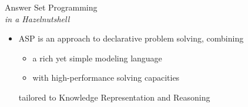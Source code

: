\begin{frame}{Answer Set Programming\\[-2pt]\small\emph{in a Hazelnutshell}}
  \bigskip
  \bigskip
  \begin{itemize}
  \item <1->
    ASP is an approach to \alert{declarative problem solving},
    combining
    \begin{itemize}
    \item a rich yet simple modeling language
    \item with high-performance solving capacities
    \end{itemize}
    tailored to \alert<1>{Knowledge Representation and Reasoning} %
  \end{itemize}
  \bigskip
  \bigskip
\end{frame}
